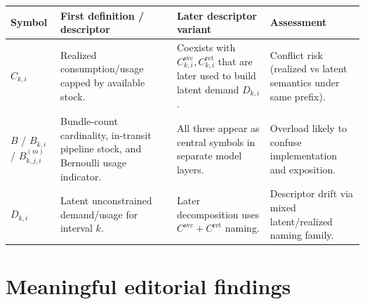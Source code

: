 \documentclass[11pt]{article}
\begin{document}
\begin{longtable}{|>{\raggedright\arraybackslash}p{}|>{\raggedright\arraybackslash}p{}|>{\raggedright\arraybackslash}p{}|>{\raggedright\arraybackslash}p{}|}
\hline
\textbf{Symbol} & \textbf{First definition / descriptor} & \textbf{Later descriptor variant} & \textbf{Assessment} \\
\hline
$C_{k,i}$ & Realized consumption/usage capped by available stock. & Coexists with $C^{\mathrm{svc}}_{k,i},C^{\mathrm{ret}}_{k,i}$ that are later used to build latent demand $D_{k,i}$. & Conflict risk (realized vs latent semantics under same prefix). \\
\hline
$B$ / $B_{k,i}$ / $B^{(m)}_{k,j,i}$ & Bundle-count cardinality, in-transit pipeline stock, and Bernoulli usage indicator. & All three appear as central symbols in separate model layers. & Overload likely to confuse implementation and exposition. \\
\hline
$D_{k,i}$ & Latent unconstrained demand/usage for interval $k$. & Later decomposition uses $C^{\mathrm{svc}}+C^{\mathrm{ret}}$ naming. & Descriptor drift via mixed latent/realized naming family. \\
\hline
\end{longtable}

\section*{Meaningful editorial findings}
\end{document}

